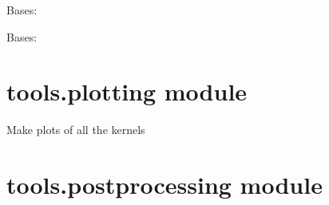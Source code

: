 \documentclass[letterpaper,10pt,english]{sphinxmanual}
\begin{document}
\begin{fulllineitems}
\label{tools:tools.par_utils.Consumer}
Bases: 

\begin{fulllineitems}
\label{tools:tools.par_utils.Consumer.run}
\end{fulllineitems}


\end{fulllineitems}


\begin{fulllineitems}
\label{tools:tools.par_utils.Task}
Bases: \href{https://docs.python.org/2/library/functions.html\#object}{}

\end{fulllineitems}



\section{tools.plotting module}
\label{tools:module-tools.plotting}\label{tools:tools-plotting-module}

\begin{fulllineitems}
\label{tools:tools.plotting.plotKernels}
Make plots of all the kernels

\end{fulllineitems}



\section{tools.postprocessing module}
\label{tools:tools-postprocessing-module}\label{tools:module-tools.postprocessing}
\end{document}
